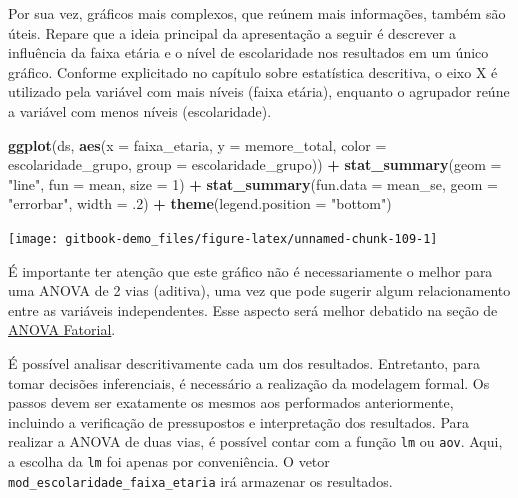 \documentclass[
]{book}
\newenvironment{Shaded}{\begin{snugshade}}{\end{snugshade}}
\newcommand{\DataTypeTok}[1]{\textcolor[rgb]{0.13,0.29,0.53}{#1}}
\newcommand{\DecValTok}[1]{\textcolor[rgb]{0.00,0.00,0.81}{#1}}
\newcommand{\FloatTok}[1]{\textcolor[rgb]{0.00,0.00,0.81}{#1}}
\newcommand{\KeywordTok}[1]{\textcolor[rgb]{0.13,0.29,0.53}{\textbf{#1}}}
\newcommand{\NormalTok}[1]{#1}
\newcommand{\OperatorTok}[1]{\textcolor[rgb]{0.81,0.36,0.00}{\textbf{#1}}}
\newcommand{\StringTok}[1]{\textcolor[rgb]{0.31,0.60,0.02}{#1}}
\begin{document}
Por sua vez, gráficos mais complexos, que reúnem mais informações,
também são úteis. Repare que a ideia principal da apresentação a seguir
é descrever a influência da faixa etária e o nível de escolaridade nos
resultados em um único gráfico. Conforme explicitado no capítulo sobre
estatística descritiva, o eixo X é utilizado pela variável com mais
níveis (faixa etária), enquanto o agrupador reúne a variável com menos
níveis (escolaridade).

\begin{Shaded}
\begin{Highlighting}[]
\KeywordTok{ggplot}\NormalTok{(ds, }\KeywordTok{aes}\NormalTok{(}\DataTypeTok{x =}\NormalTok{ faixa_etaria, }\DataTypeTok{y =}\NormalTok{ memore_total, }\DataTypeTok{color =}\NormalTok{ escolaridade_grupo, }\DataTypeTok{group  =}\NormalTok{ escolaridade_grupo)) }\OperatorTok{+}
\StringTok{  }\KeywordTok{stat_summary}\NormalTok{(}\DataTypeTok{geom =} \StringTok{"line"}\NormalTok{, }\DataTypeTok{fun =}\NormalTok{ mean, }\DataTypeTok{size =} \DecValTok{1}\NormalTok{) }\OperatorTok{+}
\StringTok{  }\KeywordTok{stat_summary}\NormalTok{(}\DataTypeTok{fun.data =}\NormalTok{ mean_se, }\DataTypeTok{geom =} \StringTok{"errorbar"}\NormalTok{, }\DataTypeTok{width =} \FloatTok{.2}\NormalTok{) }\OperatorTok{+}
\StringTok{  }\KeywordTok{theme}\NormalTok{(}\DataTypeTok{legend.position =} \StringTok{"bottom"}\NormalTok{)}
\end{Highlighting}
\end{Shaded}

\begin{center}\texttt{[image: gitbook-demo\_files/figure-latex/unnamed-chunk-109-1]} \end{center}

É importante ter atenção que este gráfico não é necessariamente o melhor
para uma ANOVA de 2 vias (aditiva), uma vez que pode sugerir algum
relacionamento entre as variáveis independentes. Esse aspecto será
melhor debatido na seção de \protect\hyperlink{anova_fatorial}{ANOVA
Fatorial}.

É possível analisar descritivamente cada um dos resultados. Entretanto,
para tomar decisões inferenciais, é necessário a realização da modelagem
formal. Os passos devem ser exatamente os mesmos aos performados
anteriormente, incluindo a verificação de pressupostos e interpretação
dos resultados. Para realizar a ANOVA de duas vias, é possível contar
com a função \texttt{lm} ou \texttt{aov}. Aqui, a escolha da \texttt{lm}
foi apenas por conveniência. O vetor
\texttt{mod\_escolaridade\_faixa\_etaria} irá armazenar os resultados.
\end{document}
